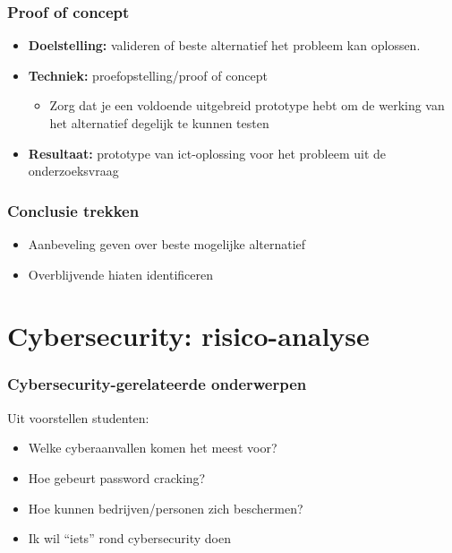 \documentclass[aspectratio=169]{beamer}
\begin{document}
\begin{frame}
  \frametitle{Proof of concept}

  \begin{itemize}
    \item \textbf{Doelstelling:} valideren of beste alternatief het probleem kan oplossen.
    \item \textbf{Techniek:} proefopstelling/proof of concept
          \begin{itemize}
            \item Zorg dat je een voldoende uitgebreid prototype hebt om de werking van het alternatief degelijk te kunnen testen
          \end{itemize}
    \item \textbf{Resultaat:} prototype van ict-oplossing voor het probleem uit de onderzoeksvraag
  \end{itemize}

\end{frame}

\begin{frame}
  \frametitle{Conclusie trekken}

  \begin{itemize}
    \item Aanbeveling geven over beste mogelijke alternatief
    \item Overblijvende hiaten identificeren
  \end{itemize}

\end{frame}

\section{Cybersecurity: risico-analyse}

\begin{frame}
  \frametitle{Cybersecurity-gerelateerde onderwerpen}

  Uit voorstellen studenten:

  \begin{itemize}
    \item Welke cyberaanvallen komen het meest voor?
    \item Hoe gebeurt password cracking?
    \item Hoe kunnen bedrijven/personen zich beschermen?
    \item Ik wil ``iets'' rond cybersecurity doen
  \end{itemize}

  \bigskip


\end{frame}
\end{document}
